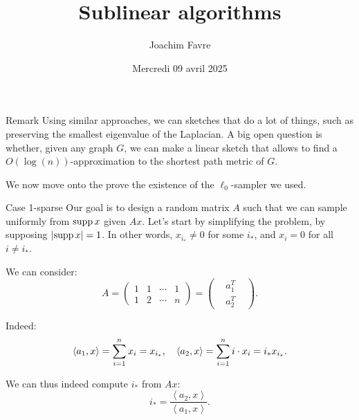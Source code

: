 \documentclass[a4paper]{article}
\title{Sublinear algorithms}
\author{Joachim Favre}
\date{Mercredi 09 avril 2025}
\begin{document}
\maketitle


\begin{parag}{Remark}
    Using similar approaches, we can sketches that do a lot of things, such as preserving the smallest eigenvalue of the Laplacian. A big open question is whether, given any graph $G$, we can make a linear sketch that allows to find a $O\left(\log\left(n\right)\right)$-approximation to the shortest path metric of $G$.

    We now move onto the prove the existence of the $\ell_0$-sampler we used.
\end{parag}

\begin{parag}{Case 1-sparse}
    Our goal is to design a random matrix $A$ such that we can sample uniformly from $\operatorname{supp} x$ given $A x$. Let's start by simplifying the problem, by supposing $\left|\supp x\right| = 1$. In other words, $x_{i_*} \neq 0$ for some $i_*$, and $x_i = 0$ for all $i \neq i_*$.

    We can consider: 
    \[A = \begin{pmatrix} 1 & 1 & \cdots & 1 \\ 1 & 2 & \cdots & n \end{pmatrix} = \begin{pmatrix}  & a_1^T &  \\  & a_2^T &  \end{pmatrix} .\]

    Indeed:
    \[\left\langle a_1, x \right\rangle = \sum_{i=1}^{n} x_i = x_{i_*}, \mathspace \left\langle a_2, x \right\rangle = \sum_{i=1}^{n} i \cdot x_i = i_* x_{i_*}.\]
    
    We can thus indeed compute $i_*$ from $A x$:
    \[i_* = \frac{\left\langle a_2, x \right\rangle}{\left\langle a_1, x \right\rangle}.\]
\end{parag}
\end{document}
